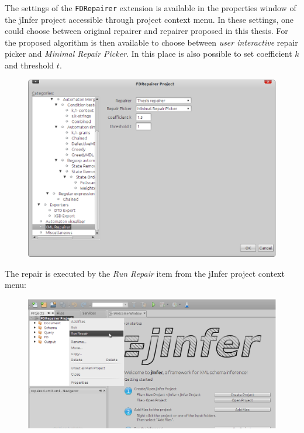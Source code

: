 The settings of the \texttt{FDRepairer} extension is available in the properties window of the jInfer project accessible through project context menu. In these settings, one could choose between original repairer and repairer proposed in this thesis. For the proposed algorithm is then available to choose between \emph{user interactive} repair picker and \emph{Minimal Repair Picker}. In this place is also possible to set coefficient $k$ and threshold $t$.

\begin{figure}[H]
    \centering\includegraphics[width=\textwidth]{tutorial_images/project_properties}
\end{figure}

The repair is executed by the \emph{Run Repair} item from the jInfer project context menu:

\begin{figure}[H]
    \centering\includegraphics[width=\textwidth]{tutorial_images/run_repair}
\end{figure}

